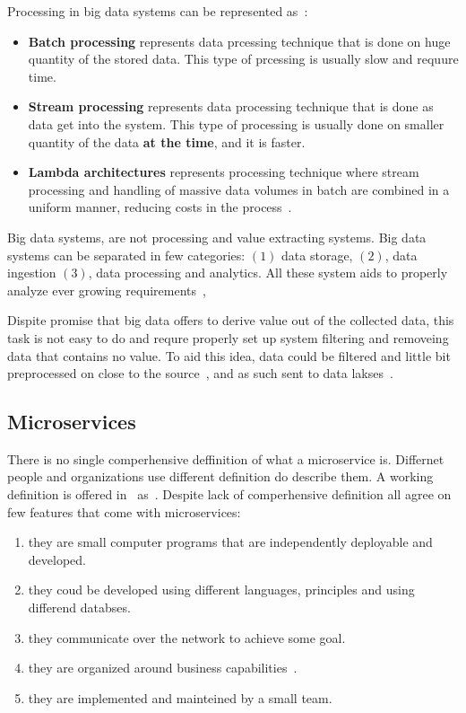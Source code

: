 Processing in big data systems can be represented as~\cite{phdthesis, KiranMMDB15}:

\begin{itemize}
	\item \textbf{Batch processing} represents data prcessing technique that is done on huge quantity of the stored data. This type of prcessing is usually slow and requure time.
	\item \textbf{Stream processing} represents data processing technique that is done as data get into the system. This type of processing is usually done on smaller quantity of the data \textbf{at the time}, and it is faster.
	\item \textbf{Lambda architectures} represents processing technique where stream processing and handling of massive data volumes in batch are combined in a uniform manner, reducing costs in the process~\cite{KiranMMDB15}.
\end{itemize}

Big data systems, are not processing and value extracting systems. Big data systems can be separated in few categories: $(1)$ data storage, $(2)$, data ingestion $(3)$, data processing and analytics. All these system aids to properly analyze ever growing requirements~\cite{RaoMBG19},

Dispite promise that big data offers to derive value out of the collected data, this task is not easy to do and requre properly set up system filtering and removeing data that contains no value. To aid this idea, data could be filtered and little bit preprocessed on close to the source~\cite{inproceedingsSimic1}, and as such sent to data lakses~\cite{MarynowskiSP15}.
%
%
\subsection{Microservices}\label{sec:microservices}
%
There is no single comperhensive deffinition of what a microservice is. Differnet people and organizations use different definition do describe them. A working definition is offered in~\cite{DragoniGLMMMS16} as~. Despite lack of comperhensive definition all agree on few features that come with microservices: 

\begin{enumerate}[start=1,label={(\bfseries \arabic*)}]
	\item they are small computer programs that are independently deployable and developed.
	\item they coud be developed using different languages, principles and using differend databses.
	\item they communicate over the network to achieve some goal.
	\item they are organized around business capabilities~\cite{PautassoZALJ17}.
	\item they are implemented and mainteined by a small team.
\end{enumerate}

